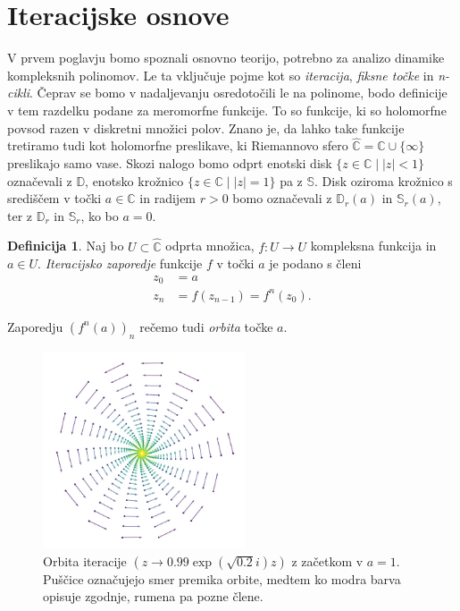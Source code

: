 \documentclass[12pt,a4paper]{amsart}
\theoremstyle{definition} %
\newtheorem{definicija}{Definicija}[section]
\theoremstyle{plain} %
\newcommand{\CC}{\mathbb C}
\newcommand{\CCinf} {\hat{\CC}} %
\newcommand{\D}{\mathbb D} %
\newcommand{\SSS}{\mathbb S} %
\begin{document}
\section{Iteracijske osnove}
V prvem poglavju bomo spoznali osnovno teorijo, potrebno za analizo dinamike kompleksnih polinomov.
Le ta vključuje pojme kot so {\em iteracija}, {\em fiksne točke} in {\em n-cikli}.
Čeprav se bomo v nadaljevanju osredotočili le na polinome, bodo definicije v tem razdelku podane za meromorfne funkcije. 
To so funkcije, ki so holomorfne povsod razen v diskretni množici polov. 
Znano je, da lahko take funkcije tretiramo tudi kot holomorfne preslikave, 
ki Riemannovo sfero $\CCinf=\CC\cup\{\infty\}$ preslikajo samo vase. 
Skozi nalogo bomo odprt enotski disk $\{z \in \CC \mid |z| < 1\}$ označevali z $\D$, enotsko krožnico $\{z \in \CC \mid |z| = 1\}$ pa z $\SSS$.
Disk oziroma krožnico s središčem v točki $a\in\CC$ in radijem $r>0$ bomo označevali z $\D_r(a)$ in $\SSS_r(a)$, 
ter z $\D_r$ in $\SSS_r$, ko bo $a=0$.  

\begin{definicija}
Naj bo $U \subset \CCinf$ odprta množica, $f\colon U\to U$ kompleksna funkcija in $a\in U$.
\emph{Iteracijsko zaporedje} funkcije $f$ v točki $a$ je podano s členi
\begin{equation*}
\begin{aligned}
z_0 &= a \\
z_n &= f(z_{n-1}) = f^n(z_0).
\end{aligned}
\end{equation*}
\end{definicija}

\noindent Zaporedju $(f^n(a))_n$ rečemo tudi {\em orbita} točke $a$.

\begin{figure}[h]
\includegraphics[width=6cm]{graphics/orbitaQuiver3.jpg}
\caption{
Orbita iteracije $(z \to 0.99 \exp(\sqrt{0.2}i)z)$ z začetkom v $a=1$.
Puščice označujejo smer premika orbite, medtem ko
modra barva opisuje zgodnje, rumena pa pozne člene.
}
\end{figure}
\end{document}
